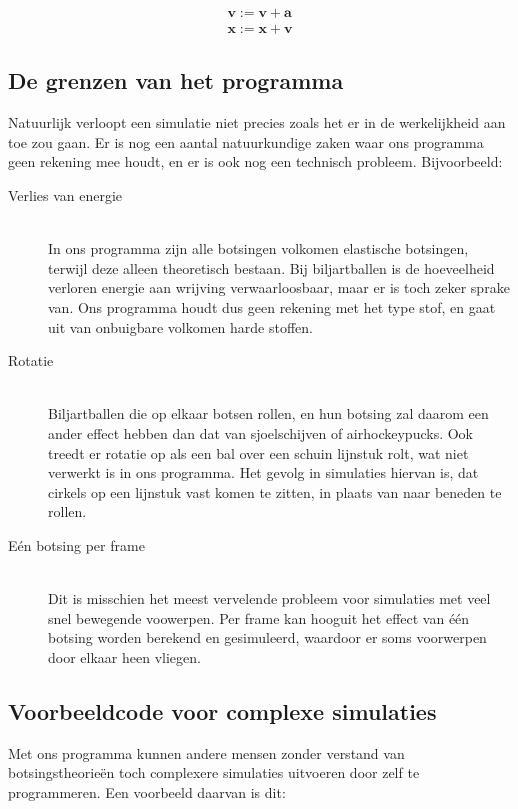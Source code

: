 \documentclass[12pt,a4paper]{article}
\begin{document}
	\begin{equation}
		\begin{aligned}
			\mathbf{v} := \mathbf{v} + \mathbf{a} \\
			\mathbf{x} := \mathbf{x} + \mathbf{v}
		\end{aligned}
	\end{equation}
	
	\subsection{De grenzen van het programma}
	Natuurlijk verloopt een simulatie niet precies zoals het er in de werkelijkheid aan toe zou gaan. Er is nog een aantal natuurkundige zaken waar ons programma geen rekening mee houdt, en er is ook nog een technisch probleem. Bijvoorbeeld:
	\begin{description}
  		\item[Verlies van energie] \hfill \\
  			In ons programma zijn alle botsingen volkomen elastische botsingen, terwijl deze alleen theoretisch bestaan. Bij biljartballen is de hoeveelheid verloren energie aan wrijving verwaarloosbaar, maar er is toch zeker sprake van. Ons programma houdt dus geen rekening met het type stof, en gaat uit van onbuigbare volkomen harde stoffen.
		\item[Rotatie] \hfill \\
			Biljartballen die op elkaar botsen rollen, en hun botsing zal daarom een ander effect hebben dan dat van sjoelschijven of airhockeypucks. Ook treedt er rotatie op als een bal over een schuin lijnstuk rolt, wat niet verwerkt is in ons programma. Het gevolg in simulaties hiervan is, dat cirkels op een lijnstuk vast komen te zitten, in plaats van naar beneden te rollen.
		\item[E\'{e}n botsing per frame] \hfill \\
			Dit is misschien het meest vervelende probleem voor simulaties met veel snel bewegende voowerpen. Per frame kan hooguit het effect van \'{e}\'{e}n botsing worden berekend en gesimuleerd, waardoor er soms voorwerpen door elkaar heen vliegen.
	\end{description}
	
	\subsection{Voorbeeldcode voor complexe simulaties}
	Met ons programma kunnen andere mensen zonder verstand van botsingstheorie\"{e}n toch complexere simulaties uitvoeren door zelf te programmeren. Een voorbeeld daarvan is dit:
	
\end{document}
